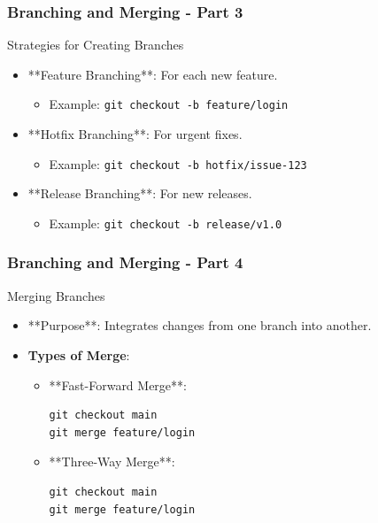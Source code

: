 \documentclass{beamer}
\begin{document}
\begin{frame}[fragile]
    \frametitle{Branching and Merging - Part 3}

    \begin{block}{Strategies for Creating Branches}
        \begin{itemize}
            \item **Feature Branching**: For each new feature.
                \begin{itemize}
                    \item Example: \texttt{git checkout -b feature/login}
                \end{itemize}
            \item **Hotfix Branching**: For urgent fixes.
                \begin{itemize}
                    \item Example: \texttt{git checkout -b hotfix/issue-123}
                \end{itemize}
            \item **Release Branching**: For new releases.
                \begin{itemize}
                    \item Example: \texttt{git checkout -b release/v1.0}
                \end{itemize}
        \end{itemize}
    \end{block}

\end{frame}

\begin{frame}[fragile]
    \frametitle{Branching and Merging - Part 4}

    \begin{block}{Merging Branches}
        \begin{itemize}
            \item **Purpose**: Integrates changes from one branch into another.
            \item \textbf{Types of Merge}:
                \begin{itemize}
                    \item **Fast-Forward Merge**:
                        \begin{lstlisting}
git checkout main
git merge feature/login
                        \end{lstlisting}
                    \item **Three-Way Merge**:
                        \begin{lstlisting}
git checkout main
git merge feature/login
                        \end{lstlisting}
                \end{itemize}
        \end{itemize}
    \end{block}

\end{frame}
\end{document}

